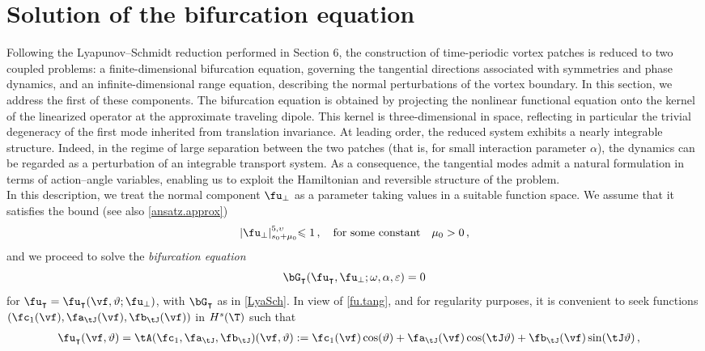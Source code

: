 \documentclass[a4paper,reqno,10pt]{article}
\begin{document}
\section{Solution of the bifurcation equation}\label{section.bifurcation}
Following the Lyapunov–Schmidt reduction performed in Section 6, the construction of time-periodic vortex patches is reduced to two coupled problems: a finite-dimensional bifurcation equation, governing the tangential directions associated with symmetries and phase dynamics, and an infinite-dimensional range equation, describing the normal perturbations of the vortex boundary.
In this section, we address the first of these components.
The bifurcation equation is obtained by projecting the nonlinear functional equation onto the kernel of the linearized operator at the approximate traveling dipole. This kernel is three-dimensional in space, reflecting in particular the trivial degeneracy of the first mode inherited from translation invariance. At leading order, the reduced system exhibits a nearly integrable structure. Indeed, in the regime of large separation between the two patches (that is, for small interaction parameter $\alpha$), the dynamics can be regarded as a perturbation of an integrable transport system.
As a consequence, the tangential modes admit a natural formulation in terms of action–angle variables, enabling us to exploit the Hamiltonian and reversible structure of the problem.\\
In this description, we treat the normal component \( \fu_{\perp} \) as a parameter taking values in a suitable function space. We assume that it satisfies the bound (see also \eqref{ansatz.approx})
\begin{equation}\label{ansatz.fu.bifurc}
| \fu_{\perp} |_{s_0+ \mu_0}^{5,\upsilon} {\leqslant  1}\,, \quad \textnormal{for some constant} \quad \mu_0 >0 \,,
\end{equation}
and we proceed to solve the  {\it bifurcation equation}
\begin{equation}
	\bG_{\intercal}(\fu_{\intercal},\fu_{\perp};\omega,\alpha,\varepsilon) = 0
\end{equation}
for $\fu_{\intercal} = \fu_{\intercal}(\vf,\vartheta;\fu_{\perp})$, with $\bG_{\intercal}$ as in \eqref{LyaSch}. In view of \eqref{fu.tang}, and for regularity  purposes, it is convenient to seek functions  $(\fc_{1}(\vf),\fa_{\tJ}(\vf),\fb_{\tJ}(\vf))$ in $H^s(\T)$ such that
	\begin{align}
	\fu_{\intercal}(\vf,\vartheta) = 	\tA(\fc_{1},\fa_{\tJ},\fb_{\tJ})(\vf,\vartheta)& :=  \fc_{1}(\vf) \cos(\vartheta) + \fa_{\tJ}(\vf)\cos(\tJ\vartheta)+\fb_{\tJ}(\vf)\sin(\tJ\vartheta)\,,\label{A.map.abc}
	\end{align}
\end{document}
